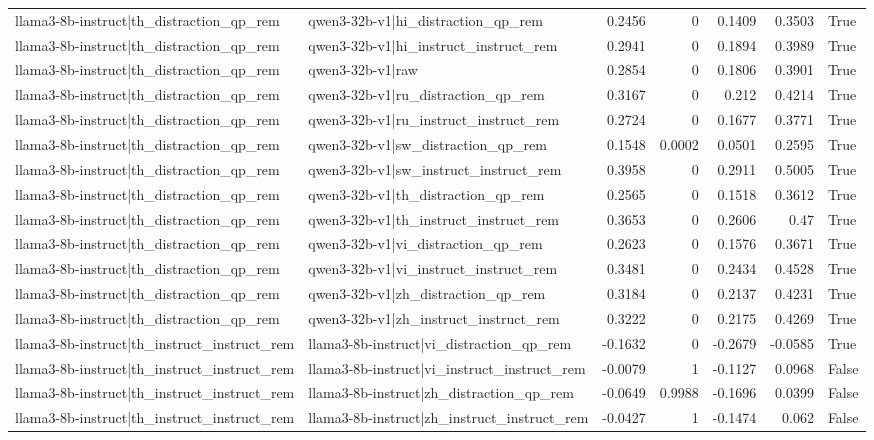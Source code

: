 \begin{table}
\begin{tabular}{l l r r r r l}
llama3-8b-instruct|th_distraction_qp_rem & qwen3-32b-v1|hi_distraction_qp_rem & 0.2456 & 0 & 0.1409 & 0.3503 & True \\
llama3-8b-instruct|th_distraction_qp_rem & qwen3-32b-v1|hi_instruct_instruct_rem & 0.2941 & 0 & 0.1894 & 0.3989 & True \\
llama3-8b-instruct|th_distraction_qp_rem & qwen3-32b-v1|raw & 0.2854 & 0 & 0.1806 & 0.3901 & True \\
llama3-8b-instruct|th_distraction_qp_rem & qwen3-32b-v1|ru_distraction_qp_rem & 0.3167 & 0 & 0.212 & 0.4214 & True \\
llama3-8b-instruct|th_distraction_qp_rem & qwen3-32b-v1|ru_instruct_instruct_rem & 0.2724 & 0 & 0.1677 & 0.3771 & True \\
llama3-8b-instruct|th_distraction_qp_rem & qwen3-32b-v1|sw_distraction_qp_rem & 0.1548 & 0.0002 & 0.0501 & 0.2595 & True \\
llama3-8b-instruct|th_distraction_qp_rem & qwen3-32b-v1|sw_instruct_instruct_rem & 0.3958 & 0 & 0.2911 & 0.5005 & True \\
llama3-8b-instruct|th_distraction_qp_rem & qwen3-32b-v1|th_distraction_qp_rem & 0.2565 & 0 & 0.1518 & 0.3612 & True \\
llama3-8b-instruct|th_distraction_qp_rem & qwen3-32b-v1|th_instruct_instruct_rem & 0.3653 & 0 & 0.2606 & 0.47 & True \\
llama3-8b-instruct|th_distraction_qp_rem & qwen3-32b-v1|vi_distraction_qp_rem & 0.2623 & 0 & 0.1576 & 0.3671 & True \\
llama3-8b-instruct|th_distraction_qp_rem & qwen3-32b-v1|vi_instruct_instruct_rem & 0.3481 & 0 & 0.2434 & 0.4528 & True \\
llama3-8b-instruct|th_distraction_qp_rem & qwen3-32b-v1|zh_distraction_qp_rem & 0.3184 & 0 & 0.2137 & 0.4231 & True \\
llama3-8b-instruct|th_distraction_qp_rem & qwen3-32b-v1|zh_instruct_instruct_rem & 0.3222 & 0 & 0.2175 & 0.4269 & True \\
llama3-8b-instruct|th_instruct_instruct_rem & llama3-8b-instruct|vi_distraction_qp_rem & -0.1632 & 0 & -0.2679 & -0.0585 & True \\
llama3-8b-instruct|th_instruct_instruct_rem & llama3-8b-instruct|vi_instruct_instruct_rem & -0.0079 & 1 & -0.1127 & 0.0968 & False \\
llama3-8b-instruct|th_instruct_instruct_rem & llama3-8b-instruct|zh_distraction_qp_rem & -0.0649 & 0.9988 & -0.1696 & 0.0399 & False \\
llama3-8b-instruct|th_instruct_instruct_rem & llama3-8b-instruct|zh_instruct_instruct_rem & -0.0427 & 1 & -0.1474 & 0.062 & False \\

\end{tabular}
\end{table}
